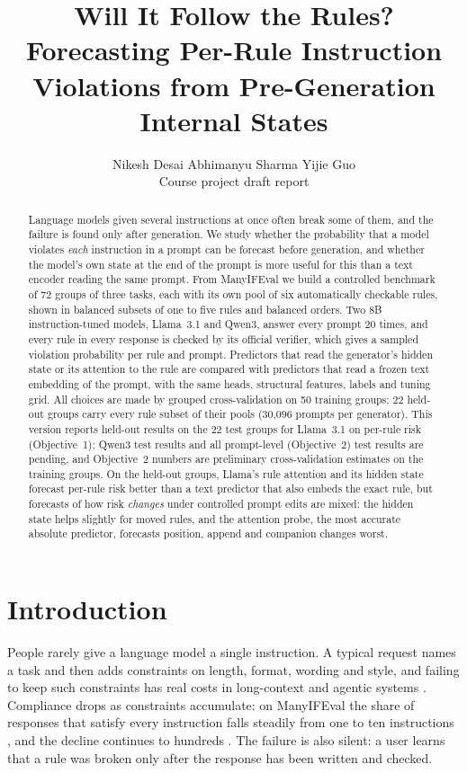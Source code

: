 \documentclass{article}
\title{Will It Follow the Rules? Forecasting Per-Rule Instruction\\ Violations from Pre-Generation Internal States}
\author{%
  Nikesh Desai \quad Abhimanyu Sharma \quad Yijie Guo\\
  Course project draft report\\
}
\begin{document}
\maketitle

\begin{abstract}
Language models given several instructions at once often break some of them, and the failure is found only after
generation. We study whether the probability that a model violates
\emph{each} instruction in a prompt can be forecast before generation, and whether the model's own state at the end
of the prompt is more useful for this than a text encoder reading the same prompt. From ManyIFEval we build a
controlled benchmark of 72 groups of three tasks, each with its own pool of six automatically checkable rules, shown
in balanced subsets of one to five rules and balanced orders. Two 8B instruction-tuned models, Llama~3.1 and Qwen3,
answer every prompt 20 times, and every rule in every response is checked by its official verifier, which gives a
sampled violation probability per rule and prompt. Predictors that read the generator's hidden state or its attention to
the rule are compared with predictors that read a frozen text embedding of the prompt, with the same heads, structural
features, labels and tuning grid. All choices are made by grouped cross-validation on 50 training
groups; 22 held-out groups carry every rule subset of their pools (30,096 prompts per generator). This version reports held-out results on the 22 test groups for Llama~3.1 on per-rule risk (Objective~1);
Qwen3 test results and all prompt-level (Objective~2) test results are pending, and Objective~2 numbers are preliminary
cross-validation estimates on the training groups. On the held-out groups, Llama's rule attention and its hidden state
forecast per-rule risk better than a text predictor that also embeds the exact rule, but forecasts of how risk
\emph{changes} under controlled prompt edits are mixed: the hidden state helps slightly for moved rules, and the
attention probe, the most accurate absolute predictor, forecasts position, append and companion changes worst.
\end{abstract}

\section{Introduction}
\label{sec:intro}

People rarely give a language model a single instruction. A typical request names a task and then adds constraints on
length, format, wording and style, and failing to keep such constraints has real costs in long-context and agentic
systems \citep{robinette2026repeatedly,wang2026compaction}. Compliance drops as constraints accumulate: on ManyIFEval
the share of responses that satisfy every instruction falls steadily from one to ten instructions
\citep{harada2025instructions}, and the decline continues to hundreds \citep{jaroslawicz2025many}. The failure is
also silent: a user learns that a rule was broken only after the response has been written and checked.
\end{document}
